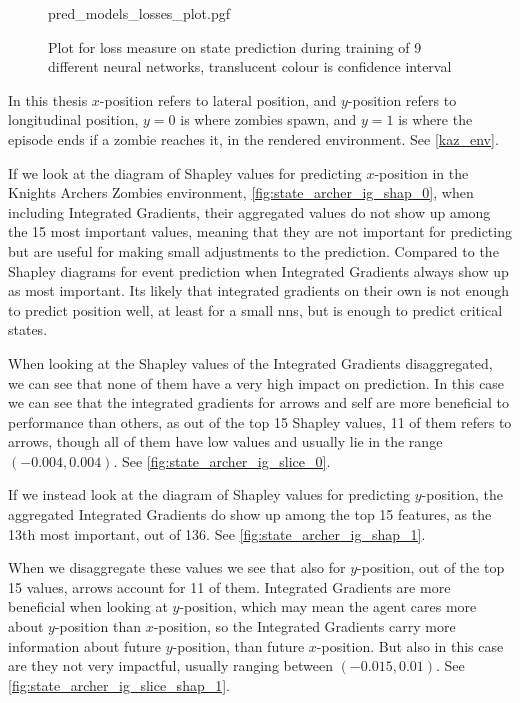 \documentclass[UKenglish]{uiomasterthesis}
\begin{document}
\begin{figure}[H]
\centering
{pred_models_losses_plot.pgf}
\caption{Plot for loss measure on state prediction during training of 9 different neural networks, translucent colour is confidence interval}
\label{fig:state_archer_losses}
\end{figure}

In this thesis $x$-position refers to lateral position, and $y$-position refers to longitudinal position, $y=0$ is where zombies spawn, and $y=1$ is where the episode ends if a zombie reaches it, in the rendered environment. See \cref{kaz_env}.

If we look at the diagram of Shapley values for predicting $x$-position in the Knights Archers Zombies environment, \cref{fig:state_archer_ig_shap_0}, when including Integrated Gradients, their aggregated values do not show up among the 15 most important values, meaning that they are not important for predicting but are useful for making small adjustments to the prediction. Compared to the Shapley diagrams for event prediction when Integrated Gradients always show up as most important. Its likely that integrated gradients on their own is not enough to predict position well, at least for a small \acp{nn}, but is enough to predict critical states.

When looking at the Shapley values of the Integrated Gradients disaggregated, we can see that none of them have a very high impact on prediction. In this case we can see that the integrated gradients for arrows and self are more beneficial to performance than others, as out of the top 15 Shapley values, 11 of them refers to arrows, though all of them have low values and usually lie in the range $(-0.004, 0.004)$. See \cref{fig:state_archer_ig_slice_0}. 

If we instead look at the diagram of Shapley values for predicting $y$-position, the aggregated Integrated Gradients do show up among the top 15 features, as the 13th most important, out of 136. See \cref{fig:state_archer_ig_shap_1}.

When we disaggregate these values we see that also for $y$-position, out of the top 15 values, arrows account for 11 of them. Integrated Gradients are more beneficial when looking at $y$-position, which may mean the agent cares more about $y$-position than $x$-position, so the Integrated Gradients carry more information about future $y$-position, than future $x$-position. But also in this case are they not very impactful, usually ranging between $(-0.015,0.01)$. See \cref{fig:state_archer_ig_slice_shap_1}.
\end{document}
